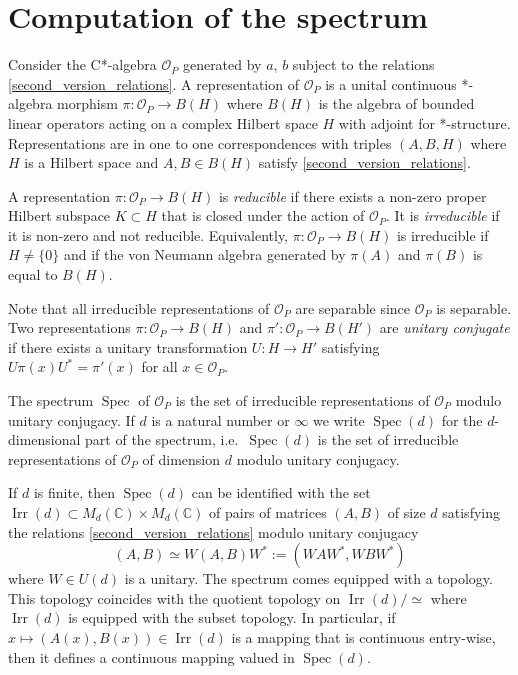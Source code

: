 \documentclass[12pt, a4paper]{amsart}
\def\Spec{\operatorname{Spec}}
\def\Irr{\operatorname{Irr}}
\def\C{\mathbb{C}}
\newcommand{\CO}[0]{\mathcal{O}} \newcommand{\CP}[0]{\mathcal{P}}
\numberwithin{equation}{section}
\begin{document}
\section{Computation of the spectrum}

Consider the C*-algebra $\CO_P$ generated by $a$, $b$ subject to the relations \eqref{second_version_relations}.
A representation of $\CO_P$ is a unital continuous *-algebra morphism $\pi:\CO_P\to B(H)$ where $B(H)$ is the algebra of bounded linear operators acting on a complex Hilbert space $H$ with adjoint for *-structure.
Representations are in one to one correspondences with triples $(A,B,H)$ where $H$ is a Hilbert space and $A,B\in B(H)$ satisfy \eqref{second_version_relations}.

A representation $\pi:\CO_P\to B(H)$ is \emph{reducible} if there exists a non-zero proper Hilbert subspace $K\subset H$ that is closed under the action of $\CO_P.$
It is \emph{irreducible} if it is non-zero and not reducible. 
Equivalently, $\pi:\CO_P\to B(H)$ is irreducible if $H\neq \{0\}$ and if the von Neumann algebra generated by $\pi(A)$ and $\pi(B)$ is equal to $B(H).$

Note that all irreducible representations of $\CO_P$ are separable since $\CO_P$ is separable. 
Two representations $\pi:\CO_P\to B(H)$ and $\pi':\CO_P\to B(H')$ are \emph{unitary conjugate} if there exists a unitary transformation $U:H\to H'$ satisfying $U\pi(x)U^*=\pi'(x)$ for all $x\in \CO_P.$

The spectrum $\Spec$ of $\CO_P$ is the set of irreducible representations of $\CO_P$ modulo unitary conjugacy.
If $d$ is a natural number or $\infty$ we write $\Spec(d)$ for the $d$-dimensional part of the spectrum, i.e.~$\Spec(d)$ is the set of irreducible representations of $\CO_P$ of dimension $d$ modulo unitary conjugacy.

If $d$ is finite, then $\Spec(d)$ can be identified with the set $\Irr(d)\subset M_d(\C)\times M_d(\C)$ of pairs of matrices $(A,B)$ of size $d$ satisfying the relations \eqref{second_version_relations} modulo unitary conjugacy 
$$(A,B)\simeq W(A,B)W^*:=(WAW^*,WBW^*)$$ 
where $W\in U(d)$ is a unitary. 
The spectrum comes equipped with a topology. 
This topology coincides with the quotient topology on $\Irr(d)/\simeq$ where $\Irr(d)$ is equipped with the subset topology.
In particular, if $x\mapsto (A(x),B(x))\in \Irr(d)$ is a mapping that is continuous entry-wise, then it defines a continuous mapping valued in $\Spec(d).$
\end{document}

